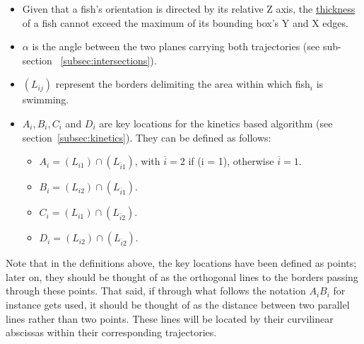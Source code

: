 \begin{itemize}
\item Given that a fish's orientation is directed by its relative Z axis, the \uline{thickness} of a fish cannot exceed the maximum of its bounding box's Y and X edges.
\item $\alpha$ is the angle between the two planes carrying both trajectories (see sub-section ~\ref{subsec:intersections}).
\item $(L_{ij})$ represent the borders delimiting the area within which fish$_i$ is swimming.
\item $A_i, B_i, C_i$ and $D_i$ are key locations for the kinetics based algorithm (see section~\ref{subsec:kinetics}). They can be defined as follows:
\begin{itemize}
\item $A_i = (L_{i1}) \cap (L_{\overline{i}1})$, with $\overline{i} = 2 $ if (i = 1), otherwise $\overline{i} = 1$.
\item $B_i = (L_{i2}) \cap (L_{\overline{i}1})$.
\item $C_i = (L_{i1}) \cap (L_{\overline{i}2})$.
\item $D_i = (L_{i2}) \cap (L_{\overline{i}2})$.
\end{itemize}
 
\end{itemize}

Note that in the definitions above, the key locations have been defined as points; later on, they should be thought of as the orthogonal lines to the borders passing through these points. That said, if through what follows the notation $A_iB_i$ for instance gets used, it should be thought of as the distance between two parallel lines rather than two points. These lines will be located by their curvilinear abscissas within their corresponding trajectories.\\

